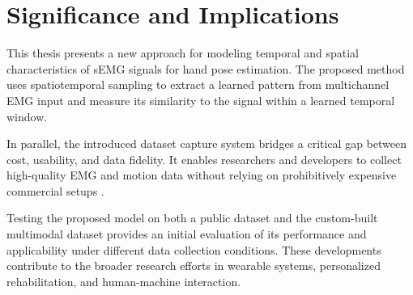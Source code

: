 \section{Significance and Implications}

This thesis presents a new approach for modeling temporal and spatial characteristics of sEMG signals for hand pose estimation. The proposed method uses spatiotemporal sampling to extract a learned pattern from multichannel EMG input and measure its similarity to the signal within a learned temporal window.

In parallel, the introduced dataset capture system bridges a critical gap between cost, usability, and data fidelity. It enables researchers and developers to collect high-quality EMG and motion data without relying on prohibitively expensive commercial setups \cite{quivira2018translating}.

Testing the proposed model on both a public dataset and the custom-built multimodal dataset provides an initial evaluation of its performance and applicability under different data collection conditions. These developments contribute to the broader research efforts in wearable systems, personalized rehabilitation, and human-machine interaction.
